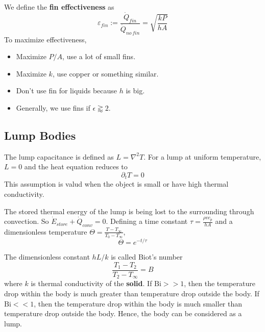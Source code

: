 \documentclass[a4paper]{article}
\numberwithin{equation}{section}
\begin{document}
	We define the \textbf{fin effectiveness} as
	\begin{equation}
		\varepsilon_{fin}:=\frac{\dot Q_{fin}}{\dot Q_{no\,fin}}=\sqrt{\frac{kP}{hA}}
	\end{equation}
	To maximize effectiveness,
	\begin{itemize}
		\item Maximize $P/A$, use a lot of small fins. 
		\item Maximize $k$, use copper or something similar.
		\item Don't use fin for liquids because $h$ is big.
		\item Generally, we use fins if $\epsilon\gtrapprox2$.
	\end{itemize}
	
	\subsection{Lump Bodies}
	The lump capacitance is defined as $L=\nabla^2T$. For a lump at uniform temperature, $L=0$ and the heat equation reduces to 
	\begin{equation}
		\partial_tT=0
	\end{equation}
	This assumption is valud when the object is small or have high thermal conductivity.

	The stored thermal energy of the lump is being lost to the surrounding through convection. So $\dot E_{store}+\dot Q_{conv}=0$. Defining a time constant $\tau=\frac{\rho vc_p}{hA}$ and a dimensionless temperature $\Theta=\frac{T-T_\infty}{T_0-T_\infty}$,
	\begin{equation}
		\Theta=e^{-t/\tau}
	\end{equation}

	The dimensionless constant $hL/k$ is called Biot's number
	\begin{equation}
		\frac{T_1-T_2}{T_2-T_\infty}=B
	\end{equation}
	where $k$ is thermal conductivity of the \textbf{solid}. If $\mathrm{Bi}>>1$, then the temperature drop within the body is much greater than temperature drop outside the body. If $\mathrm{Bi}<<1$, then the temperature drop within the body is much smaller than temperature drop outside the body. Hence, the body can be considered as a lump.

	
\end{document}
